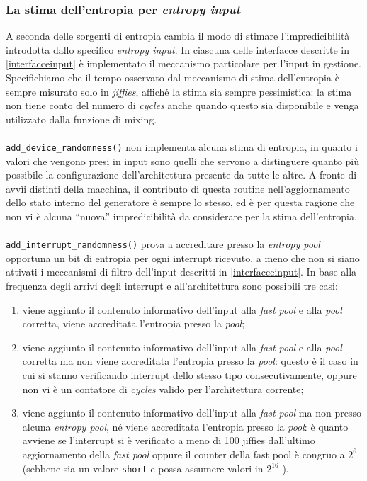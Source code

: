 \documentclass{article}
\begin{document}
 \subsubsection{La stima dell'entropia per \emph{entropy
 input}}\label{stimaInput} 
 A seconda delle sorgenti di entropia cambia il modo
 di stimare l'impredicibilità introdotta dallo specifico \emph{entropy input}.
 In ciascuna delle interfacce descritte in \ref{interfacceinput} è implementato
 il meccanismo particolare per l'input in gestione. Specifichiamo che il tempo 
 osservato dal meccanismo di stima dell'entropia
 è sempre misurato solo in \emph{jiffies}, affiché la stima sia sempre
 pessimistica:
 la stima non tiene conto del numero di \emph{cycles} anche quando questo sia
 disponibile e venga utilizzato dalla funzione di mixing.
 
 \paragraph{}\verb+add_device_randomness()+ non implementa alcuna stima di
 entropia, in quanto i valori che vengono presi in input sono quelli che servono
 a distinguere quanto più possibile la configurazione dell'architettura
 presente da tutte le altre. A fronte di avvìi distinti della macchina, il
 contributo di questa routine nell'aggiornamento dello stato interno del
 generatore è sempre lo stesso, ed è per questa ragione che non vi è alcuna
 ``nuova'' impredicibilità da considerare per la stima dell'entropia.
 
 \paragraph{}\verb+add_interrupt_randomness()+ prova a accreditare presso la
 \emph{entropy pool} opportuna un bit di entropia per ogni interrupt ricevuto, a
 meno che non si siano attivati i meccanismi di filtro dell'input descritti in
 \ref{interfacceinput}. In base alla frequenza degli arrivi degli interrupt e
 all'architettura sono possibili tre casi:
 \begin{enumerate}
   \item viene aggiunto il contenuto informativo dell'input alla \emph{fast
   pool} e alla \emph{pool} corretta, viene accreditata l'entropia presso la
   \emph{pool};
   \item  viene aggiunto il contenuto informativo dell'input alla \emph{fast
   pool} e alla \emph{pool} corretta ma non viene accreditata l'entropia presso
   la \emph{pool}: questo è il caso in cui si stanno verificando interrupt dello
   stesso tipo consecutivamente, oppure non vi è un contatore di \emph{cycles}
   valido per l'architettura corrente;
   \item viene aggiunto il contenuto informativo dell'input alla \emph{fast
   pool} ma non presso alcuna \emph{entropy pool}, né viene accreditata
   l'entropia presso la \emph{pool}: è quanto avviene se l'interrupt si è
   verificato a meno di 100 jiffies dall'ultimo aggiornamento della \emph{fast
   pool} oppure il counter della fast pool è congruo a $2^6$ (sebbene sia un
   valore \verb+short+ e possa assumere valori in $2^{16}$ ).
 \end{enumerate}
 
\end{document}
